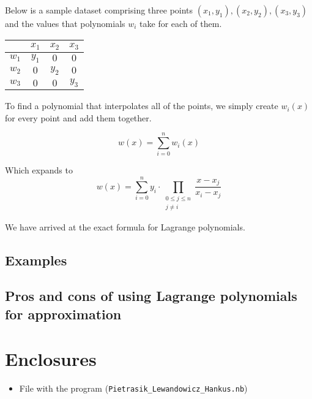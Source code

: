 \documentclass{MathematicaReport}
\begin{document}
Below is a sample dataset comprising three points 
\( (x_1, y_1), (x_2, y_2), (x_3, y_3) \) and the values that polynomials \(w_i\)
take for each of them.

\begin{table}[h!]
    \centering
    \begin{tabular}{c|ccc}
			      & \( x_1 \) & \( x_2 \) & \( x_3 \)\\ \hline
        \( w_1 \) & \( y_1 \) & \(  0  \) & \(  0  \)\\ 
        \( w_2 \) & \(  0  \) & \( y_2 \) & \(  0  \)\\ 
        \( w_3 \) & \(  0  \) & \(  0  \) & \( y_3 \)\\ 
    \end{tabular}
\end{table}

To find a polynomial that interpolates all of the points, we simply create
\( w_i(x) \) for every point and add them together.

\[
	w(x) = \sum_{i = 0}^n w_i(x)
\]

Which expands to	
\[
	w(x) = \sum_{i=0}^n y_i \cdot \prod_{\begin{smallmatrix}0\le j\le n\\ j\neq i\end{smallmatrix}}
	 \frac{x-x_j}{x_i-x_j}
\]

We have arrived at the exact formula for Lagrange polynomials.

\subsection{Examples}

\subsection{Pros and cons of using Lagrange polynomials for approximation}


\section*{Enclosures} 
\begin{itemize}
	\item File with the program (\texttt{Pietrasik\_Lewandowicz\_Hankus.nb})
\end{itemize}
\end{document}
